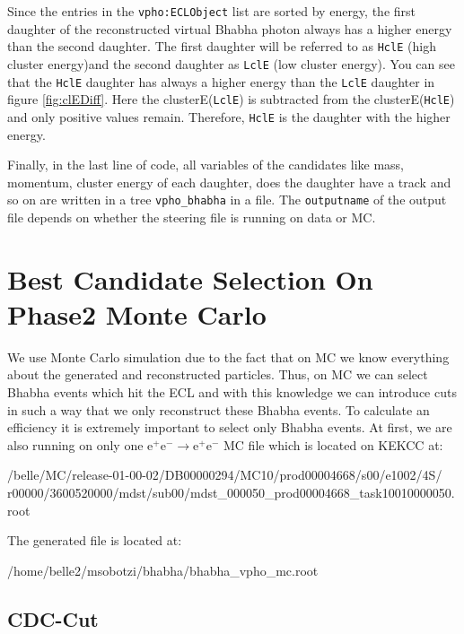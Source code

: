 \documentclass[a4paper,11pt,twosided,final,german,openbib,pdftex,listof=totoc,bibliography=totoc]{scrbook}
\begin{document}
Since the entries in the \texttt{vpho:ECLObject} list are sorted by energy, the first daughter of the reconstructed virtual Bhabha photon always has a higher energy than the second daughter. The first daughter will be referred to as \texttt{HclE} (high cluster energy)and the second daughter as \texttt{LclE} (low cluster energy). You can see that the \texttt{HclE} daughter has always a higher energy than the \texttt{LclE} daughter in figure \ref{fig:clEDiff}. Here the clusterE(\texttt{LclE}) is subtracted from the clusterE(\texttt{HclE}) and only positive values remain. Therefore, \texttt{HclE} is the daughter with the higher energy.

Finally, in the last line of code, all variables of the candidates like mass, momentum, cluster energy of each daughter, does the daughter have a track and so on are written in a tree \texttt{vpho\_bhabha} in a file. The \texttt{outputname} of the output file depends on whether the steering file is running on data or MC. 


\section{Best Candidate Selection On Phase2 Monte Carlo}
\label{sec:SelectingBhabhaMC}

We use Monte Carlo simulation due to the fact that on MC we know everything about the generated and reconstructed particles. Thus, on MC we can select Bhabha events which hit the ECL and with this knowledge we can introduce cuts in such a way that we only reconstruct these Bhabha events. To calculate an efficiency it is extremely  important to select only Bhabha events. At first, we are also running on only one $\textrm{e}^+ \textrm{e}^- \rightarrow \textrm{e}^+ \textrm{e}^-$ MC file which is located on KEKCC at:
\newline

/belle/MC/release-01-00-02/DB00000294/MC10/prod00004668/s00/e1002/4S/
r00000/3600520000/mdst/sub00/mdst\_000050\_prod00004668\_task10010000050.root
\newline

The generated file is located at:

 /home/belle2/msobotzi/bhabha/bhabha\_vpho\_mc.root
\newline


\subsection{CDC-Cut}
\end{document}

